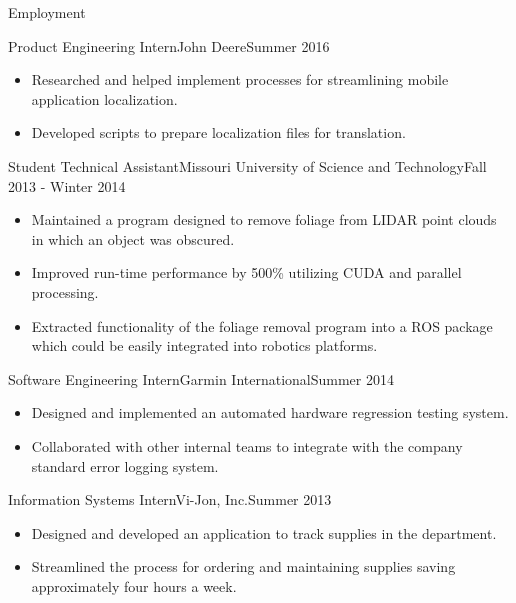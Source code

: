 \documentclass[]{mcdowellcv}
\begin{document}
\begin{cvsection}{Employment}
\begin{johndeere}
    \begin{cvsubsection}{Product Engineering Intern}{John Deere}{Summer 2016}
        \begin{itemize}
            \item Researched and helped implement processes for streamlining mobile application localization.
            \item Developed scripts to prepare localization files for translation.
        \end{itemize}
    \end{cvsubsection}
\end{johndeere}
    
\begin{rockmech}
    \begin{cvsubsection}[2]{Student Technical Assistant}{Missouri University of Science and Technology}{Fall 2013 - Winter 2014}        
        \begin{itemize}
            \item Maintained a program designed to remove foliage from LIDAR point clouds in which an object was obscured.
            \item Improved run-time performance by 500\% utilizing CUDA and parallel processing.
            \item Extracted functionality of the foliage removal program into a ROS package which could be easily integrated into robotics platforms.
        \end{itemize}
    \end{cvsubsection}
\end{rockmech}
    
\begin{garmin}
    \begin{cvsubsection}{Software Engineering Intern}{Garmin International}{Summer 2014}   
        \begin{itemize}
            \item Designed and implemented an automated hardware regression testing system.
            \item Collaborated with other internal teams to integrate with the company standard error logging system.
        \end{itemize}
    \end{cvsubsection}
\end{garmin}

\begin{vijon}
    \begin{cvsubsection}{Information Systems Intern}{Vi-Jon, Inc.}{Summer 2013}
        \begin{itemize}
            \item Designed and developed an application to track supplies in the department.
            \item Streamlined the process for ordering and maintaining supplies saving approximately four hours a week.
        \end{itemize}
    \end{cvsubsection}
\end{vijon}


\end{cvsection}
\end{document}

